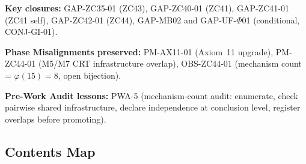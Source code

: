 \documentclass[11pt, a4paper]{article}
\begin{document}
\begin{volumebox}[title={Part F --- CRF Complete Edition v17.8
  (Parts XXXI--XXXIV)}]
\textbf{Key closures:}
GAP-ZC35-01 (ZC43), GAP-ZC40-01 (ZC41), GAP-ZC41-01 (ZC41 self),
GAP-ZC42-01 (ZC44), GAP-MB02 and GAP-UF-$\Phi$01 (conditional,
CONJ-GI-01).

\textbf{Phase Misalignments preserved:}
PM-AX11-01 (Axiom~11 upgrade),
PM-ZC44-01 (M5/M7 CRT infrastructure overlap),
OBS-ZC44-01 (mechanism count = $\varphi(15) = 8$, open bijection).

\textbf{Pre-Work Audit lessons:} PWA-5 (mechanism-count audit:
enumerate, check pairwise shared infrastructure, declare independence
at conclusion level, register overlaps before promoting).
\end{volumebox}

\subsection*{Contents Map}
\end{document}

